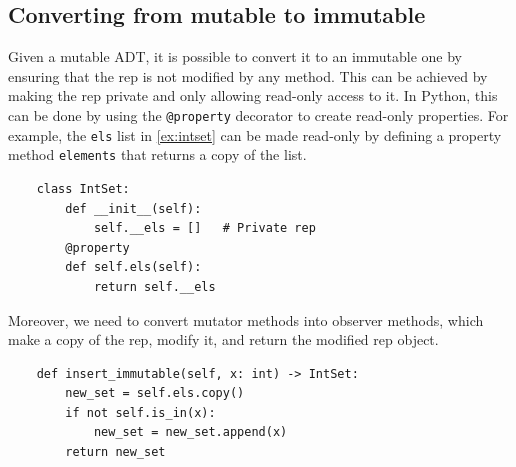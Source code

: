 \documentclass[oneside,11pt,dvipsnames]{book}
\newcommand{\code}[1]{\texttt{#1}}
\begin{document}


\subsection{Converting from mutable to immutable}\label{sec:converting-mutable-to-immutable}

Given a mutable ADT, it is possible to convert it to an immutable one by ensuring that the rep is not modified by any method. This can be achieved by making the rep private and only allowing read-only access to it. In Python, this can be done by using the \code{@property} decorator to create read-only properties. For example, the \code{els} list in \autoref{ex:intset} can be made read-only by defining a property method \code{elements} that returns a copy of the list.

\begin{lstlisting}
    class IntSet:
        def __init__(self):
            self.__els = []   # Private rep
        @property
        def self.els(self):
            return self.__els
\end{lstlisting}

Moreover, we need to convert mutator methods into observer methods, which make a copy of the rep, modify it, and return the modified rep object.  
\begin{lstlisting}
    def insert_immutable(self, x: int) -> IntSet:
        new_set = self.els.copy()
        if not self.is_in(x):
            new_set = new_set.append(x)
        return new_set
\end{lstlisting}
\end{document}
